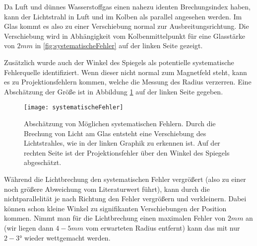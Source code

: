 Da Luft und dünnes Wasserstoffgas einen nahezu identen Brechungsindex haben, kann der Lichtstrahl in Luft und im Kolben als parallel angesehen werden. Im Glas kommt es also zu einer Verschiebung normal zur Ausbreitungsrichtung. Die Verschiebung wird in Abhängigkeit vom Kolbenmittelpunkt für eine Glasstärke von \( 2 \unit{mm} \) in \autoref{fig:systematischeFehler} auf der linken Seite gezeigt.

Zusätzlich wurde auch der Winkel des Spiegels als potentielle systematische Fehlerquelle identifiziert. Wenn dieser nicht normal zum Magnetfeld steht, kann es zu Projektionsfehlern kommen, welche die Messung des Radius verzerren. Eine Abschätzung der Größe ist in Abbildung \ref{fig:systematischeFehler} auf der linken Seite gegeben. 

\begin{figure}[H]
	\texttt{[image: systematischeFehler]}
	\caption{Abschätzung von Möglichen systematischen Fehlern. Durch die Brechung von Licht am Glas entsteht eine Verschiebung des Lichtstrahles, wie in der linken Graphik zu erkennen ist. Auf der rechten Seite ist der Projektionsfehler über den Winkel des Spiegels abgeschätzt.}
	\label{fig:systematischeFehler}
\end{figure}

Während die Lichtbrechung den systematischen Fehler vergrößert (also zu einer noch größere Abweichung vom Literaturwert führt), kann durch die nichtparallelität je nach Richtung den Fehler vergrößern und verkleinern. Dabei können schon kleine Winkel zu signifikanten Verschiebungen der Position kommen. Nimmt man für die Lichtbrechung einen maximalen Fehler von \( 2 \unit{mm} \) an (wir liegen dann \( 4 - 5 \unit{mm} \) vom erwarteten Radius entfernt) kann das mit nur \( 2 - 3 \unit{°} \) wieder wettgemacht werden. 






















